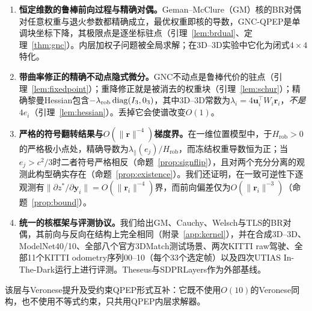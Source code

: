 \begin{enumerate}
\item \textbf{恒定维数的鲁棒前向过程与精确对偶。}Geman--McClure（GM）核的BR对偶对任意权重与退火参数都精确成立，最优权重即核的导数，GNC-QPEP是单调块坐标下降，其极限点是逐坐标驻点（引理~\ref{lem:brdual}、定理~\ref{thm:gnc}）。内层加权子问题被全局求解；在3D--3D实验中它化为闭式$4\times4$特化。
\item \textbf{带曲率修正的精确不动点隐式微分。}GNC不动点是鲁棒代价的驻点（引理~\ref{lem:fixedpoint}）；重降修正就是被消去的权重块（引理~\ref{lem:schur}）；精确黎曼Hessian包含$-\lambda_{\mathrm{rob}}\operatorname{diag}(I_3,0_3)$，其中3D--3D常数为$\lambda_i=4\mathbf{u}_i^\top W_i\mathbf{r}_i$，\emph{不是}$4e_i$（引理~\ref{lem:hessian}）。丢掉它会使谱改变$O(1)$。
\item \textbf{严格的符号翻转结果与$O(\|\mathbf{r}\|^{-4})$梯度界。}在一维位置模型中，于$H_{\mathrm{rob}}>0$的严格极小点处，精确导数为$\lambda_\parallel(e_j)/H_{\mathrm{rob}}$，而冻结权重导数恒为正；当$e_j>c^2/3$时二者符号严格相反（命题~\ref{prop:signflip}），且对两个充分分离的观测此构型确实存在（命题~\ref{prop:existence}）。我们还证明，在一致可逆性下逐观测有$\|\partial z^*/\partial\mathbf{y}_i\|=O(\|\mathbf{r}_i\|^{-4})$界，而前向偏差仅为$O(\|\mathbf{r}_i\|^{-3})$（命题~\ref{prop:bound}）。
\item \textbf{统一的核框架与评测协议。}我们给出GM、Cauchy、Welsch与TLS的BR对偶，其前向与反向在结构上完全相同（附录~\ref{app:kernel}），并在合成3D--3D、ModelNet40/10、全部八个官方3DMatch测试场景、两次KITTI raw驾驶、全部11个KITTI odometry序列00--10（每个33个选定帧）以及四次UTIAS In-The-Dark运行上进行评测。Theseus与SDPRLayers作为外部基线。
\end{enumerate}

该层与Veronese提升及受约束QPEP形式互补：它既不使用$O(10)$的Veronese同构，也不使用不等式约束，只共用QPEP内层求解器。
